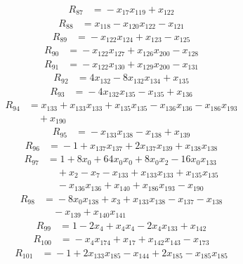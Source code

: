 \begin{align*}
R_{87}&={}-x_{17}x_{119} +x_{122}
\end{align*}
\begin{align*}
R_{88}&={}x_{118} -x_{120}x_{122} -x_{121}
\end{align*}
\begin{align*}
R_{89}&={}-x_{122}x_{124} +x_{123} -x_{125}
\end{align*}
\begin{align*}
R_{90}&={}-x_{122}x_{127} +x_{126}x_{200} -x_{128}
\end{align*}
\begin{align*}
R_{91}&={}-x_{122}x_{130} +x_{129}x_{200} -x_{131}
\end{align*}
\begin{align*}
R_{92}&={}4x_{132} -8x_{132}x_{134} +x_{135}
\end{align*}
\begin{align*}
R_{93}&={}-4x_{132}x_{135} -x_{135} +x_{136}
\end{align*}
\begin{align*}
R_{94}&={}x_{133} +x_{133}x_{133} +x_{135}x_{135} -x_{136}x_{136} -x_{186}x_{193}\\
&\quad{}+x_{190}
\end{align*}
\begin{align*}
R_{95}&={}-x_{133}x_{138} -x_{138} +x_{139}
\end{align*}
\begin{align*}
R_{96}&={}-1 +x_{137}x_{137} +2x_{137}x_{139} +x_{138}x_{138}
\end{align*}
\begin{align*}
R_{97}&={}1 +8x_{0} +64x_{0}x_{0} +8x_{0}x_{2} -16x_{0}x_{133}\\
&\quad{}+x_{2} -x_{7} -x_{133} +x_{133}x_{133} +x_{135}x_{135}\\
&\quad{}-x_{136}x_{136} +x_{140} +x_{186}x_{193} -x_{190}
\end{align*}
\begin{align*}
R_{98}&={}-8x_{0}x_{138} +x_{3} +x_{133}x_{138} -x_{137} -x_{138}\\
&\quad{}-x_{139} +x_{140}x_{141}
\end{align*}
\begin{align*}
R_{99}&={}1 -2x_{4} +x_{4}x_{4} -2x_{4}x_{133} +x_{142}
\end{align*}
\begin{align*}
R_{100}&={}-x_{4}x_{174} +x_{17} +x_{142}x_{143} -x_{173}
\end{align*}
\begin{align*}
R_{101}&={}-1 +2x_{133}x_{185} -x_{144} +2x_{185} -x_{185}x_{185}
\end{align*}
